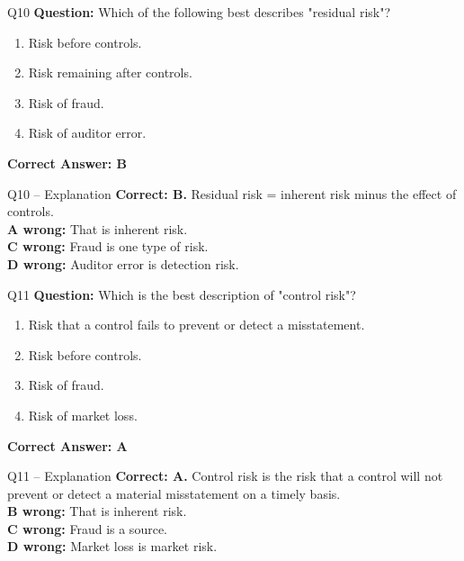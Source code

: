 \documentclass[aspectratio=169,10pt]{beamer}
\begin{document}
	\begin{frame}[t]{Q10}
		\small
		\textbf{Question:} Which of the following best describes "residual risk"?
		\begin{enumerate}[label=\Alph*.,itemsep=1pt,topsep=2pt]
			\item Risk before controls.
			\item Risk remaining after controls.
			\item Risk of fraud.
			\item Risk of auditor error.
		\end{enumerate}
		\vspace{4pt}
		\textbf{Correct Answer: B}
	\end{frame}
	
	\begin{frame}[t]{Q10 -- Explanation}
		\small
		\textbf{Correct: B.} Residual risk = inherent risk minus the effect of controls. \\[4pt]
		\textbf{A wrong:} That is inherent risk. \\[2pt]
		\textbf{C wrong:} Fraud is one type of risk. \\[2pt]
		\textbf{D wrong:} Auditor error is detection risk.
	\end{frame}
	
	\begin{frame}[t]{Q11}
		\small
		\textbf{Question:} Which is the best description of "control risk"?
		\begin{enumerate}[label=\Alph*.,itemsep=1pt,topsep=2pt]
			\item Risk that a control fails to prevent or detect a misstatement.
			\item Risk before controls.
			\item Risk of fraud.
			\item Risk of market loss.
		\end{enumerate}
		\vspace{4pt}
		\textbf{Correct Answer: A}
	\end{frame}
	
	\begin{frame}[t]{Q11 -- Explanation}
		\small
		\textbf{Correct: A.} Control risk is the risk that a control will not prevent or detect a material misstatement on a timely basis. \\[4pt]
		\textbf{B wrong:} That is inherent risk. \\[2pt]
		\textbf{C wrong:} Fraud is a source. \\[2pt]
		\textbf{D wrong:} Market loss is market risk.
	\end{frame}
	
\end{document}
